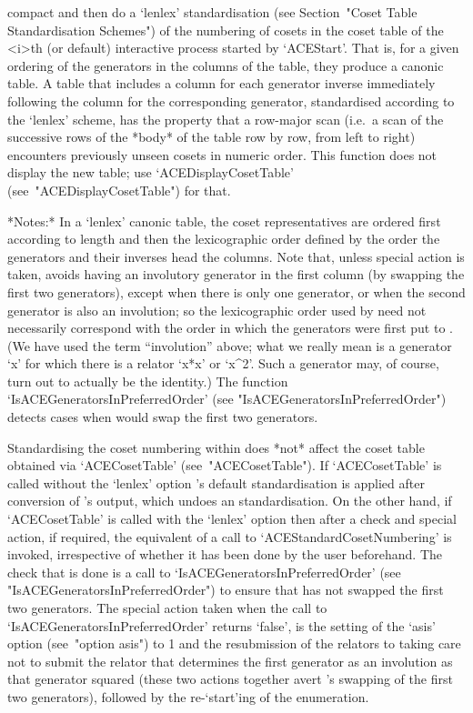 compact and then do a  `lenlex'  standardisation  (see  Section~"Coset
Table Standardisation Schemes") of the  numbering  of  cosets  in  the
coset table of the  <i>th  (or  default)  interactive  {\ACE}  process
started by `ACEStart'. That is, for a given ordering of the generators
in the columns of the table, they produce a  canonic  table.  A  table
that  includes  a  column  for  each  generator  inverse   immediately
following the column for  the  corresponding  generator,  standardised
according to the `lenlex' scheme, has the property  that  a  row-major
scan (i.e.~a scan of the successive rows of the *body*  of  the  table
row by row, from left to right) encounters previously unseen cosets in
numeric order. This function does  not  display  the  new  table;  use
`ACEDisplayCosetTable' (see~"ACEDisplayCosetTable") for that.

*Notes:*
In a `lenlex' canonic table, the  coset  representatives  are  ordered
first according to length and then the lexicographic order defined  by
the order the generators and their inverses  head  the  columns.  Note
that,  unless  special  action  is  taken,  {\ACE}  avoids  having  an
involutory generator in the first column (by swapping  the  first  two
generators), except when there is only  one  generator,  or  when  the
second generator is also an involution;  so  the  lexicographic  order
used by {\ACE} need not necessarily correspond with the order in which
the generators were first put  to  {\ACE}.  (We  have  used  the  term
``involution'' above; what we really mean is  a  generator  `x'  for
which there is a relator `x*x' or `x^2'.  Such  a  generator  may,  of
course,  turn  out  to  actually  be  the  identity.)   The   function
`IsACEGeneratorsInPreferredOrder'                                 (see
"IsACEGeneratorsInPreferredOrder") detects  cases  when  {\ACE}  would
swap the first two generators.

Standardising the coset numbering within {\ACE} does *not* affect  the
{\GAP} coset table obtained via `ACECosetTable' (see~"ACECosetTable").
If `ACECosetTable' is called  without  the  `lenlex'  option  {\GAP}'s
default  standardisation  is  applied  after  conversion  of  {\ACE}'s
output, which undoes an {\ACE} standardisation. On the other hand,  if
`ACECosetTable' is called with the `lenlex' option then after a  check
and  special  action,  if  required,  the  equivalent  of  a  call  to
`ACEStandardCosetNumbering' is invoked, irrespective of whether it has
been done by the user beforehand. The check that is done is a call  to
`IsACEGeneratorsInPreferredOrder'                                 (see
"IsACEGeneratorsInPreferredOrder")  to  ensure  that  {\ACE}  has  not
swapped the first two generators. The special action  taken  when  the
call to  `IsACEGeneratorsInPreferredOrder'  returns  `false',  is  the
setting of  the  `asis'  option  (see~"option  asis")  to  1  and  the
resubmission of the relators to {\ACE} taking care not to  submit  the
relator that determines the first generator as an involution  as  that
generator squared (these two actions together avert {\ACE}'s  swapping
of the first two generators), followed by  the  re-`start'ing  of  the
enumeration.

